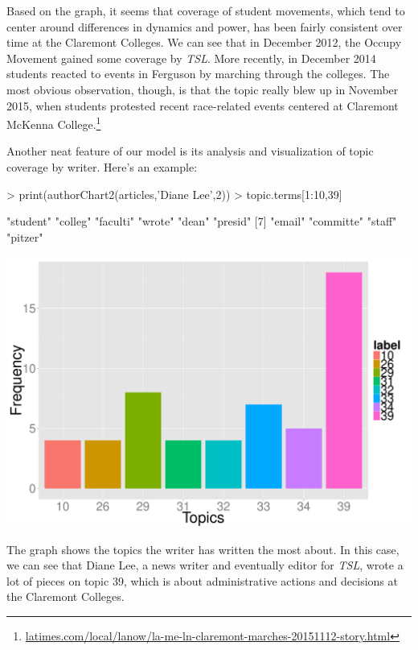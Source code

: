 \documentclass[a4paper]{article}
\begin{document}
Based on the graph, it seems that coverage of student movements, which tend to center around differences in dynamics and power, has been fairly consistent over time at the Claremont Colleges. We can see that in December 2012, the Occupy Movement gained some coverage by \textit{TSL}. More recently, in December 2014 students reacted to events in Ferguson by marching through the colleges. The most obvious observation, though, is that the topic really blew up in November 2015, when students protested recent race-related events centered at Claremont McKenna College.\footnote{\href{http://www.latimes.com/local/lanow/la-me-ln-claremont-marches-20151112-story.html}{latimes.com/local/lanow/la-me-ln-claremont-marches-20151112-story.html}}

Another neat feature of our model is its analysis and visualization of topic coverage by writer. Here's an example:

\begin{Schunk}
\begin{Sinput}
> print(authorChart2(articles,'Diane Lee',2))
> topic.terms[1:10,39]
\end{Sinput}
\begin{Soutput}
 [1] "student"  "colleg"   "faculti"  "wrote"    "dean"     "presid"  
 [7] "email"    "committe" "staff"    "pitzer"  
\end{Soutput}
\end{Schunk}
\includegraphics{FinalProject-010}

The graph shows the topics the writer has written the most about. In this case, we can see that Diane Lee, a news writer and eventually editor for \textit{TSL}, wrote a lot of pieces on topic 39, which is about administrative actions and decisions at the Claremont Colleges.
\end{document}
